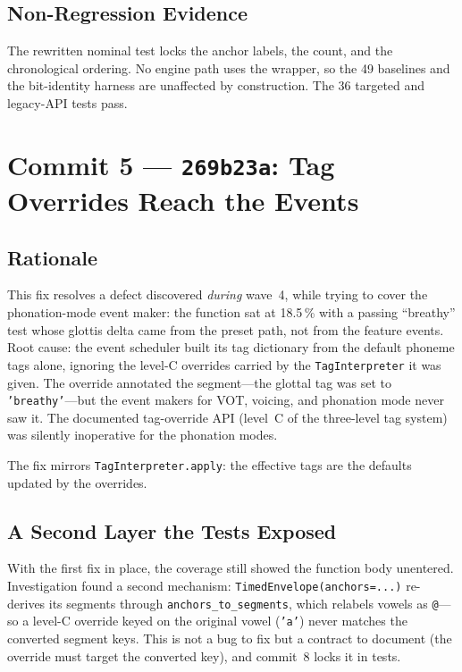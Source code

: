 \documentclass[11pt,a4paper]{article}
\newcommand{\code}[1]{\texttt{#1}}
\newcommand{\commit}[1]{\texttt{#1}}
\newcommand{\pct}[1]{{#1}\,\%}
\begin{document}
\subsection{Non-Regression Evidence}

The rewritten nominal test locks the anchor labels, the count, and
the chronological ordering. No engine path uses the wrapper, so the
49 baselines and the bit-identity harness are unaffected by
construction. The 36 targeted and legacy-API tests pass.

\section{Commit 5 --- \commit{269b23a}: Tag Overrides Reach the Events}
\label{sec:c5}

\subsection{Rationale}

This fix resolves a defect discovered \emph{during} wave~4,
while trying to cover the phonation-mode event maker: the function
sat at \pct{18.5} with a passing ``breathy'' test whose glottis
delta came from the preset path, not from the feature events.
Root cause: the event scheduler built its tag dictionary from the
default phoneme tags alone, ignoring the level-C overrides carried
by the \code{TagInterpreter} it was given. The override annotated
the segment---the glottal tag was set to \code{'breathy'}---but
the event makers for VOT, voicing, and phonation mode never saw
it. The documented tag-override API (level~C of the three-level
tag system) was silently inoperative for the phonation modes.

The fix mirrors \code{TagInterpreter.apply}: the effective tags are
the defaults updated by the overrides.

\subsection{A Second Layer the Tests Exposed}

With the first fix in place, the coverage still showed the function
body unentered. Investigation found a second mechanism:
\code{TimedEnvelope(anchors=...)} re-derives its segments through
\code{anchors\_to\_segments}, which relabels vowels as
\code{@}---so a level-C override keyed on the original vowel
(\code{'a'}) never matches the converted segment keys. This is not a
bug to fix but a contract to document (the override must target the
converted key), and commit~8 locks it in tests.
\end{document}
